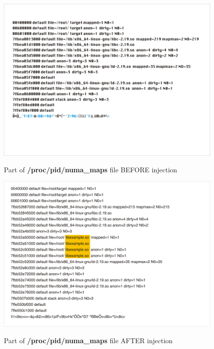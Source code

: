 \documentclass[conference]{IEEEtran}
\newcommand{\marcos}[1]{{\color{green}{MARCOS: #1}}}
\begin{document}
\begin{figure}[htb!]
\footnotesize
\caption{Part of \textbf{/proc/pid/numa\_maps} file BEFORE injection }
\includegraphics[scale=0.31]{antes-injecao.jpg}
\centering
\label{fig:antes-injecao}
\end{figure}


\begin{figure}[htb!]
\footnotesize
\caption{Part of \textbf{/proc/pid/numa\_maps} file AFTER injection }
\includegraphics[scale=0.21]{apos-injecao.jpg}
\centering
\label{fig:apos-injecao}
\end{figure}

\end{document}
